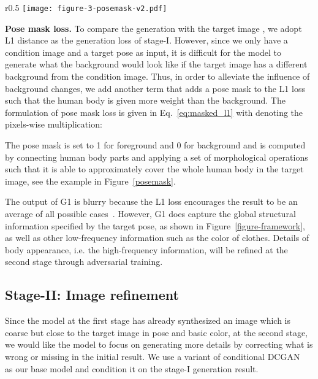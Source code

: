 \documentclass{article}
\newcommand{\myparagraph}[1]{\vspace{0.0em}\noindent\textbf{#1}}
\begin{document}
\begin{wrapfigure}{r}{0.5\textwidth}
\texttt{[image: figure-3-posemask-v2.pdf]} 
\caption{Process of computing the pose mask.}
\label{posemask}
\end{wrapfigure}
\myparagraph{Pose mask loss.}
To compare the generation  with the target image , 
we adopt L1 distance
as the generation loss of stage-I. However, since we only have a condition image and a target pose as input, it is difficult for the model to generate what the background would look like if the target image has a different background from the condition image. Thus, in order to alleviate the influence of background changes, we add another term that adds a pose mask  to the L1 loss such that the human body is given more weight than the background.
The formulation of pose mask loss is given in Eq.~\ref{eq:masked_l1} with  denoting the pixels-wise multiplication: 

The pose mask  is set to 1 for foreground and 0 for background and is computed by connecting human body parts and applying a set of morphological operations such that it is able to approximately cover the whole human body in the target image, see the example in Figure~\ref{posemask}. 

The output of G1 is blurry because the L1 loss encourages the result to be an average of all possible cases~\cite{Isola-CVPR16-Pix2pix}. 
However, G1 does capture the global structural information specified by the target pose, as shown in Figure~\ref{figure-framework}, as well as other low-frequency information such as the color of clothes. Details of body appearance, i.e. the high-frequency information, will be refined at the second stage through adversarial training.
\subsection{Stage-II: Image refinement}
Since the model at the first stage has already synthesized an image which is coarse but close to the target image in pose and basic color, at the second stage, we would like the model to focus on generating more details by correcting what is wrong or missing in the initial result. We use a variant of conditional DCGAN~\cite{Radford2015-DCGAN} as our base model and condition it on the stage-I generation result.
\end{document}
